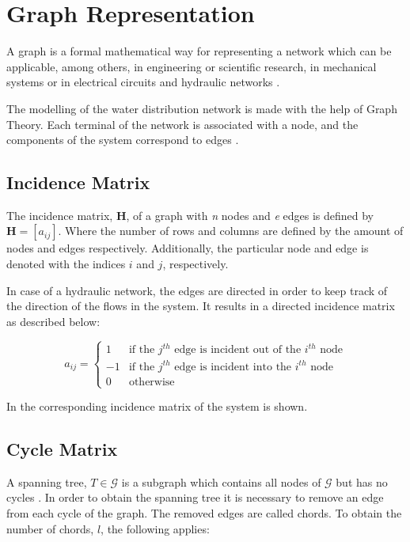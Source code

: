 \section{Graph Representation}  
\label{GraphTheory}
A graph is a formal mathematical way for representing a network which can be applicable, among others, in engineering or scientific research, in mechanical systems or in electrical circuits and hydraulic networks \cite{graph_intro}. 

The modelling of the water distribution network is made with the help of Graph Theory. Each terminal of the network is associated with a node, and the components of the system correspond to edges \cite{GraphTheoryCarsten}. 
\subsection{Incidence Matrix} 
\label{IncidenceSection}
The incidence matrix, $\pmb{H}$, of a graph with \textit{n} nodes and \textit{e} edges is 
defined by $\pmb{H} = [a_{ij}]$. Where the number of rows and columns are defined by the amount of nodes and edges respectively. 
Additionally, the particular node and edge is denoted with the indices $i$ and 
$j$, respectively.

In case of a hydraulic network, the edges are directed in order to keep track of the direction of the flows in the system. It results in a directed incidence matrix as described below:

\begin{equation}
\label{DiGraph}
 a_{ij} =
		\left\{
		\begin{array}{ll}
		
		1 			&      \text{if the $j^{th}$ edge is incident out of the $i^{th}$ node}	
\\
		-1                       &     \text{if the $j^{th}$ edge is incident into the $i^{th}$ node}
\\


                0                       &      \text{otherwise}

		\end{array}
		\right.
\end{equation}	

In  the corresponding incidence matrix of the system is 
shown. 

\subsection{Cycle Matrix}
\label{CycleSection}
A spanning tree, $T \in \mathcal{G}$ is a subgraph which contains all nodes of $\mathcal{G}$ but has no cycles \cite{GraphModel}. 
In order to obtain the spanning tree it is necessary to remove an edge from each cycle of the graph. The removed edges are called chords. To obtain the number of chords, $l$, the following applies:

